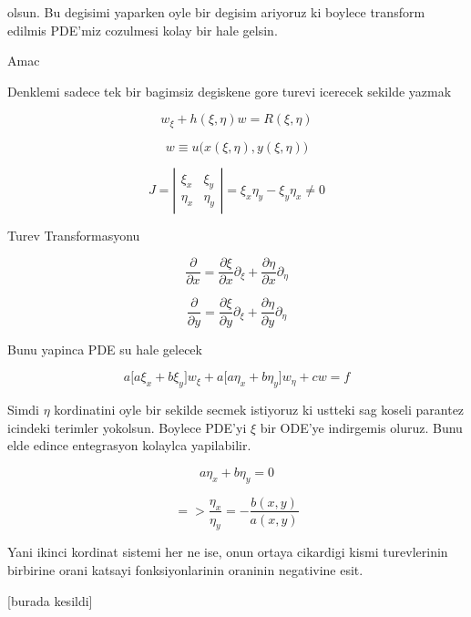 \documentclass[12pt,fleqn]{article}
\begin{document}
olsun. Bu degisimi yaparken oyle bir degisim ariyoruz ki boylece transform
edilmis PDE'miz cozulmesi kolay bir hale gelsin. 

Amac

Denklemi sadece tek bir bagimsiz degiskene gore turevi icerecek sekilde
yazmak 

\[ w_\xi + h(\xi,\eta)w  = R(\xi,\eta) \]

\[ w \equiv u \bigg( x(\xi,\eta),y(\xi,\eta) \bigg)  \]

\[ 
J = 
\left|\begin{array}{rr}
\xi_x & \xi_y \\
\eta_x & \eta_y
\end{array}\right| =
\xi_x \eta_y - \xi_y \eta_x \ne 0
 \]

Turev Transformasyonu

\[ \frac{\partial }{\partial x} = 
\frac{\partial \xi}{\partial x}  \partial_\xi + 
\frac{\partial \eta}{\partial x}\partial_\eta
\]

\[ \frac{\partial }{\partial y} = 
\frac{\partial \xi}{\partial y}  \partial_\xi + 
\frac{\partial \eta}{\partial y}\partial_\eta
\]

Bunu yapinca PDE su hale gelecek

\[ a \bigg[ a\xi_x + b\xi_y \bigg]w_\xi + 
a \bigg[ a\eta_x + b\eta_y \bigg]w_\eta + 
cw = f
 \]

Simdi $\eta$ kordinatini oyle bir sekilde secmek istiyoruz ki ustteki sag
koseli parantez icindeki terimler yokolsun. Boylece PDE'yi $\xi$ bir ODE'ye
indirgemis oluruz. Bunu elde edince entegrasyon kolaylca yapilabilir. 

\[ a \eta_x + b\eta_y = 0 \]

\[=> \frac{\eta_x}{\eta_y} = - \frac{b(x,y)}{a(x,y)} \]


Yani ikinci kordinat sistemi her ne ise, onun ortaya cikardigi kismi
turevlerinin birbirine orani katsayi fonksiyonlarinin oraninin negativine
esit.  

[burada kesildi]
\end{document}
